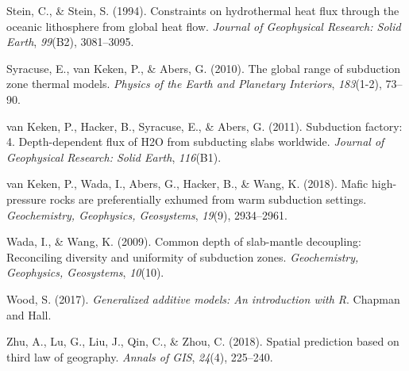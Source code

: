 \documentclass[draft,linenumbers]{agujournal2019}
\newlength{\cslhangindent}
\newenvironment{CSLReferences}[2]
 {\begin{list}{}{
  \setlength{\itemindent}{0pt}
  \setlength{\leftmargin}{0pt}
  \setlength{\parsep}{0pt}
  \ifodd #1
   \setlength{\leftmargin}{\cslhangindent}
   \setlength{\itemindent}{-\cslhangindent}
  \fi
  \setlength{\itemsep}{#2\baselineskip}
  }
  \item\relax}
 {\end{list}}
\begin{document}
\begin{CSLReferences}{1}{0}
Stein, C., \& Stein, S. (1994). Constraints on hydrothermal heat flux
through the oceanic lithosphere from global heat flow. \emph{Journal of
Geophysical Research: Solid Earth}, \emph{99}(B2), 3081--3095.

{Syracuse, E., van Keken, P., \& Abers, G.} (2010). The global range of
subduction zone thermal models. \emph{Physics of the Earth and Planetary
Interiors}, \emph{183}(1-2), 73--90.

{van Keken, P., Hacker, B., Syracuse, E., \& Abers, G.} (2011).
Subduction factory: 4. Depth-dependent flux of H2O from subducting slabs
worldwide. \emph{Journal of Geophysical Research: Solid Earth},
\emph{116}(B1).

{van Keken, P., Wada, I., Abers, G., Hacker, B., \& Wang, K.} (2018).
Mafic high-pressure rocks are preferentially exhumed from warm
subduction settings. \emph{Geochemistry, Geophysics, Geosystems},
\emph{19}(9), 2934--2961.

Wada, I., \& Wang, K. (2009). Common depth of slab-mantle decoupling:
Reconciling diversity and uniformity of subduction zones.
\emph{Geochemistry, Geophysics, Geosystems}, \emph{10}(10).

Wood, S. (2017). \emph{Generalized additive models: An introduction with
{R}}. {Chapman and Hall}.

Zhu, A., Lu, G., Liu, J., Qin, C., \& Zhou, C. (2018). Spatial
prediction based on third law of geography. \emph{Annals of GIS},
\emph{24}(4), 225--240.

\end{CSLReferences}
\end{document}
